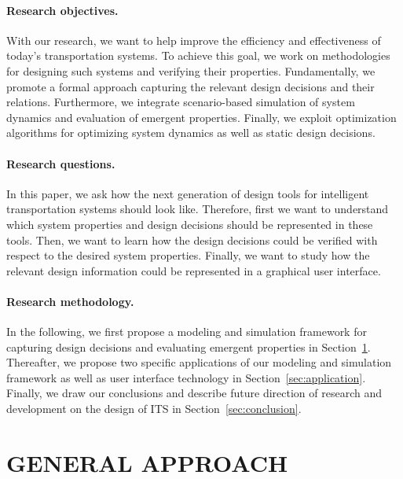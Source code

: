 \documentclass[a4paper,twoside]{article}
\begin{document}
	\paragraph{Research objectives.}
	
	With our research, we want to help improve the efficiency and effectiveness of today's transportation systems.
	To achieve this goal, we work on methodologies for designing such systems and verifying their properties.
	Fundamentally, we promote a formal approach capturing the relevant design decisions and their relations.
	Furthermore, we integrate scenario-based simulation of system dynamics and evaluation of emergent properties.
	Finally, we exploit optimization algorithms for optimizing system dynamics as well as static design decisions.
	
	\paragraph{Research questions.}
	
	In this paper, we ask how the next generation of design tools for intelligent transportation systems should look like.
	Therefore, first we want to understand which system properties and design decisions should be represented in these tools.
	Then, we want to learn how the design decisions could be verified with respect to the desired system properties.
	Finally, we want to study how the relevant design information could be represented in a graphical user interface.
	
	\paragraph{Research methodology.}
	
	In the following, we first propose a modeling and simulation framework for capturing design decisions and evaluating emergent properties in Section~\ref{sec:approach}.
	Thereafter, we propose two specific applications of our modeling and simulation framework as well as user interface technology in Section~\ref{sec:application}.
	Finally, we draw our conclusions and describe future direction of research and development on the design of ITS in Section~\ref{sec:conclusion}. 
	
	
	\section{\uppercase{General approach}}
	\label{sec:approach}
	
\end{document}
